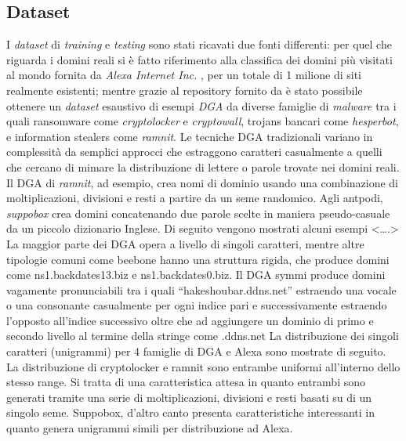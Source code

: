 \subsection{Dataset}
\label{randomforestdataset}
I \textit{dataset} di \textit{training} e \textit{testing} sono stati ricavati due fonti differenti: per quel che riguarda i domini reali si è fatto riferimento alla classifica dei domini più visitati al mondo fornita da \textit{Alexa Internet Inc.} \cite{amazon:alexa} , per un totale di 1 milione di siti realmente esistenti; mentre grazie al repository fornito da \cite{github:dgarepo} è stato possibile ottenere un \textit{dataset} esaustivo di esempi \textit{DGA} da diverse famiglie di \textit{malware} tra i quali ransomware come \textit{cryptolocker} e \textit{cryptowall}, trojans bancari come \textit{hesperbot}, e information stealers come \textit{ramnit}. Le tecniche DGA tradizionali variano in complessità da semplici approcci che estraggono caratteri casualmente a quelli che cercano di mimare la distribuzione di lettere o parole trovate nei domini reali. Il DGA di \textit{ramnit}, ad esempio, crea nomi di dominio usando una combinazione di moltiplicazioni, divisioni e resti a partire da un seme randomico. Agli antpodi, \textit{suppobox} crea domini concatenando due parole scelte in maniera pseudo-casuale da un piccolo dizionario Inglese.
Di seguito vengono mostrati alcuni esempi <….>
La maggior parte dei DGA opera a livello di singoli caratteri, mentre altre tipologie comuni come beebone hanno una struttura rigida, che produce domini come ns1.backdates13.biz e ns1.backdates0.biz.
Il DGA symmi produce domini vagamente pronunciabili tra i quali “hakeshoubar.ddns.net” estraendo una vocale o una consonante casualmente per ogni indice pari e successivamente estraendo l’opposto all’indice successivo oltre che ad aggiungere un dominio di primo e secondo livello al termine della stringe come .ddns.net
La distribuzione dei singoli caratteri (unigrammi) per 4 famiglie di DGA e Alexa sono mostrate di seguito. La distribuzione di cryptolocker e ramnit sono entrambe uniformi all’interno dello stesso range. Si tratta di una caratteristica attesa in quanto entrambi sono generati tramite una serie di moltiplicazioni, divisioni e resti basati su di un singolo seme. Suppobox, d’altro canto presenta caratteristiche interessanti in quanto genera unigrammi simili per distribuzione ad Alexa. 

